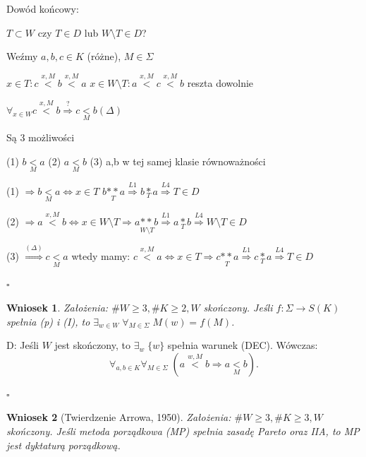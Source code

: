 \documentclass[12pt,a4paper]{article}
\theoremstyle{break}
\newtheorem{wniosek}{Wniosek}[theorem]
\begin{document}
	Dowód końcowy:
	
	$T\subset W$ czy $T \in D$ lub $W\setminus T \in D$?
	
	Weźmy $a,b,c\in K$ (różne), $M\in \Sigma$
	
	$x \in T : c\overset{x,M}{<}b\overset{x,M}{<}a$ 
	$x\in W\setminus T : a\overset{x,M}{<}c\overset{x,M}{<}b$ reszta dowolnie
	
	$\forall_{x\in W} c\overset{x,M}{<}b \overset{?}{\Rightarrow} c \underset{M}{<}b (\Delta)$
	
	Są 3 możliwości
	
	(1) $b\underset{M}{<}a$
	(2) $a\underset{M}{<}b$
	(3) a,b w tej samej klasie równoważności
	
	(1) $\Rightarrow b\underset{M}{<}a \Leftrightarrow x\in T$ $b\underset{T}{**}a \overset{L 1}{\Rightarrow} b\underset{T}{*}a \overset{L 4}{\Rightarrow} T\in D$
	
	(2) $\Rightarrow a\overset{x,M}{<}b \Leftrightarrow x\in W\setminus T \Rightarrow a\underset{W\setminus T}{**}b \overset{L1}{\Rightarrow} a\underset{T}{*}b \overset{L4}{\Rightarrow} W\setminus T \in D$
	
	(3) $\overset{(\Delta)}{\Rightarrow} c\underset{M}{<}a$ wtedy mamy: $c\overset{x,M}{<}a \Leftrightarrow x\in T \Rightarrow c\underset{T}{**}a\overset{L1}{\Rightarrow} c\underset{T}{*}a \overset{L4}{\Rightarrow}T\in D$
	
	
	
	\begin{flushright}$\square$\end{flushright}
	
	
	\begin{wniosek}
		Założenia: $\# W \geq 3, \# K \geq 2, W$ skończony.  
		Jeśli $f : \Sigma \to S(K)$ spełnia (p) i (I), to $\exists_{w \in W} \; \forall_{M \in \Sigma} \; M(w) = f(M)$.
	\end{wniosek}
	
	D: Jeśli $W$ jest skończony, to $\exists_w \; \{w\}$ spełnia warunek (DEC).  
	Wówczas:
	\[
	\forall_{a, b \in K} \forall_{M \in \Sigma} \; (a \overset{w, M}{<} b \Rightarrow a \underset{M}{<} b).
	\]
	\begin{flushright}$\square$\end{flushright}
	
	\begin{wniosek}[Twierdzenie Arrowa, 1950]
		Założenia: $\# W \geq 3, \# K \geq 3, W$ skończony.  
		Jeśli metoda porządkowa (MP) spełnia zasadę Pareto oraz IIA, to MP jest dyktaturą porządkową.
	\end{wniosek}
	
\end{document}
